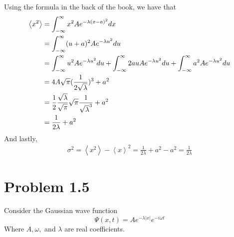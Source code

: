\documentclass{article}
\newcommand{\braket}[1]{\left\langle #1 \right\rangle}
\begin{document}
\begin{enumerate}[label=(\alph*)]
      Using the formula in the back of the book, we have that
      \begin{align*}
        \braket{x^2} &= \intinf x^2 Ae^{-\lambda (x - a)^2} dx \\
                     &= \intinf (u + a)^2 Ae^{-\lambda u^2} du \\
                     &= \intinf u^2 A e^{-\lambda u^2}du + \intinf 2auAe^{-\lambda u^2}du + \intinf a^2Ae^{-\lambda u^2}du \\
                     &= 4A\sqrt{\pi}(\frac{1}{2\sqrt{\lambda}})^3  + a^2 \\
                     &= \frac{1}{2} \frac{\sqrt\lambda}{\sqrt\pi} \sqrt{\pi} \frac{1}{\sqrt{\lambda}^3} + a^2 \\
                     &= \frac{1}{2 \lambda} + a^2
      \end{align*}
      And lastly, 
      \begin{align*}
        \sigma^2 = \braket{x^2} - \braket{x}^2 = \frac{1}{2\lambda} + a^2 - a^2 = \frac{1}{2\lambda}
      \end{align*}
  \end{enumerate}


\section{Problem 1.5}
  Consider the Gaussian wave function
  \[ \Psi(x, t) = Ae^{-\lambda |x|}e^{-i\omega t} \]
  Where $A, \omega,$ and $\lambda$ are real coefficients.
\end{document}

